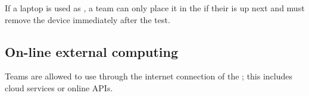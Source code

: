 If a laptop is used as \ExternalComputing{}, a team can only place it in the \ECRA{} if their \Testslot{} is up next and must remove the device immediately after the test.

\subsection{On-line external computing}\label{rule:robot_external_computing_online}

Teams are allowed to use \ExternalComputing{} through the internet connection of the \ArenaNetwork{}; this includes cloud services or online APIs.

